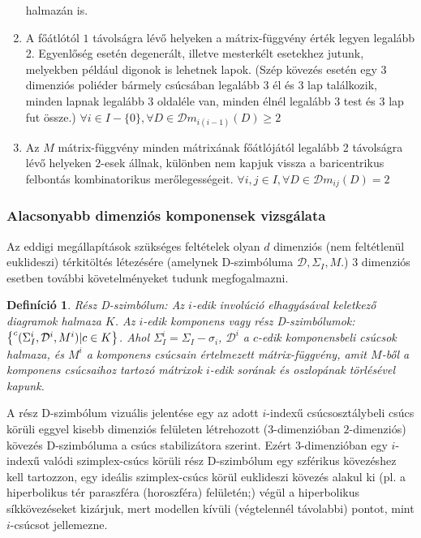 \documentclass[12pt,magyar,a4paper]{article}
\newcommand{\leftexp}[2]{{\vphantom{#2}}^{#1}{#2}}
\newtheorem{defn}[thm]{Definíció}
\begin{document}
\begin{enumerate}
    halmazán is.
  \item A főátlótól $1$ távolságra lévő helyeken a mátrix-függvény érték legyen
    legalább 2. Egyenlőség esetén degenerált, illetve mesterkélt esetekhez
    jutunk, melyekben például digonok is lehetnek lapok. (Szép kövezés esetén
    egy 3 dimenziós poliéder bármely csúcsában legalább 3 él és 3 lap
    találkozik, minden lapnak legalább 3 oldaléle van, minden élnél legalább 3
    test és 3 lap fut össze.)
    $\forall i\in I-\{0\}, \forall D\in \mathcal{D} m_{i(i-1)}(D)\geq 2$
  \item Az $M$ mátrix-függvény minden mátrixának főátlójától legalább 2
    távolságra lévő helyeken $2$-esek állnak, különben nem kapjuk vissza a
    baricentrikus felbontás kombinatorikus merőlegességeit.
    $\forall i,j\in I, \forall D\in \mathcal{D} m_{ij}(D)=2$
\end{enumerate}

\subsubsection{Alacsonyabb dimenziós komponensek vizsgálata}
Az eddigi megállapítások szükséges feltételek olyan $d$ dimenziós (nem
feltétlenül euklideszi) térkitöltés létezésére (amelynek D-szimbóluma
$\mathcal{D}, \Sigma_I, M$.) $3$ dimenziós esetben további követelményeket
tudunk megfogalmazni.

\begin{defn}
  Rész D-szimbólum: Az $i$-edik involúció elhagyásával keletkező diagramok
  halmaza $K$. Az $i$-edik komponens vagy rész D-szimbólumok:
  $\left\{\leftexp{c}(\Sigma_I^i,\mathcal{D}^i,M^i)|c \in K\right\}$. Ahol
  $\Sigma_I^i=\Sigma_I-{\sigma_i}$, $\mathcal{D}^i$ a $c$-edik komponensbeli
  csúcsok halmaza, és $M^i$ a komponens csúcsain értelmezett mátrix-függvény,
  amit $M$-ből a komponens csúcsaihoz tartozó mátrixok $i$-edik sorának és
  oszlopának törlésével kapunk.
\end{defn}

A rész D-szimbólum vizuális jelentése egy az adott $i$-indexű csúcsosztálybeli
csúcs körüli eggyel kisebb dimenziós felületen létrehozott ($3$-dimenzióban
$2$-dimenziós) kövezés D-szimbóluma a csúcs stabilizátora szerint. Ezért
$3$-dimenzióban egy $i$-indexű valódi szimplex-csúcs körüli rész D-szimbólum egy
szférikus kövezéshez kell tartozzon, egy ideális szimplex-csúcs körül euklideszi
kövezés alakul ki (pl. a hiperbolikus tér paraszféra (horoszféra) felületén;)
végül a hiperbolikus síkkövezéseket kizárjuk, mert modellen kívüli (végtelennél
távolabbi) pontot, mint $i$-csúcsot jellemezne.
\end{document}
